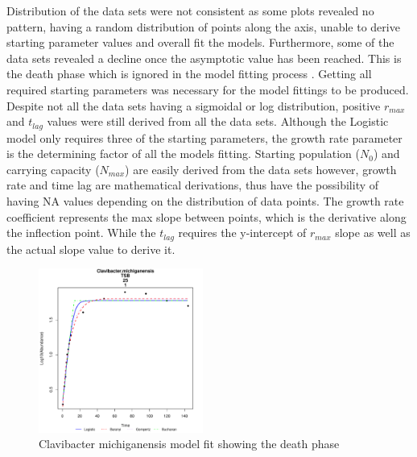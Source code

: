 \documentclass[11pt]{article}
\begin{document}
Distribution of the data sets were not consistent as some plots revealed no pattern, having a random distribution of points along the axis, unable to derive starting parameter values and overall fit the models. Furthermore, some of the data sets revealed a decline once the asymptotic value has been reached. This is the death phase which is ignored in the model fitting process \cite{zwietering1990modeling}. Getting all required starting parameters was necessary for the model fittings to be produced. Despite not all the data sets having a sigmoidal or log distribution, positive $r_{max}$ and  $t_{lag}$ values were still derived from all the data sets. Although the Logistic model only requires three of the starting parameters, the growth rate parameter is the determining factor of all the models fitting. Starting population ($N_0$) and carrying capacity ($N_{max}$) are easily derived from the data sets however, growth rate and time lag are mathematical derivations, thus have the possibility of having NA values depending on the distribution of data points. The growth rate coefficient represents the max slope between points, which is the derivative along the inflection point. While the $t_{lag}$ requires the y-intercept of $r_{max}$ slope as well as the actual slope value to derive it.
\begin{figure}
    \begin{center}
        \includegraphics[width=0.48\textwidth]{../Results/Cmichiganensis25_fit.pdf}
    \end{center}
    \caption{Clavibacter michiganensis model fit showing the death phase}
    \label{fig:Clavibacter michiganensis}
\end{figure}
\end{document}

